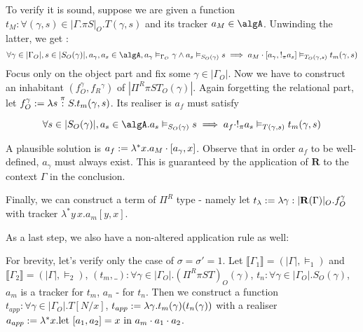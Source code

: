 \documentclass[12pt,a4paper]{article}
\renewcommand{\O}{_{O}}\alwaysmath{O}
\newcommand{\R}{\ensuremath{_{R}}}
\begin{document}
To verify it is sound, suppose we are given a function $t_M : \forall (\gamma , s) \in |\Gamma. \pi S|\O. T(\gamma, s)$ and its tracker $a_M \in \algA$. Unwinding the latter, we get :
$$\forall \gamma \in |\Gamma\O|, s \in |S\O(\gamma)|, a_\gamma, a_s \in \algA, a_\gamma \vDash_{\Gamma\O} \gamma \land a_s \vDash_{S\O(\gamma)} s \implies a_M \cdot [a_\gamma, !_\pi a_s] \vDash_{T\O(\gamma, s)} t_m(\gamma, s)$$
Focus only on the object part and fix some $\gamma \in |\Gamma\O|$. Now we have to construct an inhabitant $(f\O^\gamma, f\R^\gamma) $ of $|\Pi^R \pi S T\O(\gamma)|$. Again forgetting the relational part, let $f\O^\gamma \define \lambda s \overset{\pi}{:} S. t_m(\gamma, s)$. Its realiser is $a_f$ must satisfy

$$ \forall s \in |S\O(\gamma)|, a_s \in \algA . a_s \vDash_{S\O(\gamma)} s \implies a_f \cdot !_\pi a_s \vDash_{T(\gamma, s)} t_m(\gamma, s) $$

A plausible solution is $a_f := \lambda^* x. a_M \cdot [a_\gamma, x]$. Observe that in order $a_f$ to be well-defined, $a_\gamma$ must always exist. This is guaranteed by the application of $\mathbf{R}$ to the context $\Gamma$ in the conclusion. 

Finally, we can construct  a term of $\Pi^R$ type - namely let $t_\lambda \define \lambda \gamma : |\mathbf{R}(\Gamma)|\O. f\O^\gamma$ with tracker $\lambda^*y\, x.a_m[y, x]$.

As a last step, we also have a non-altered application rule as well:
\begin{center}
  \centering
\end{center}
For brevity, let's verify only the case of $\sigma = \sigma' = 1$. Let $\llbracket \Gamma_1 \rrbracket = (|\Gamma|, \vDash_1)$ and $\llbracket \Gamma_2 \rrbracket = (|\Gamma|, \vDash_2)$, 
$(t_m, \_) : \forall \gamma \in |\Gamma\O|. (\Pi^R\pi S T)\O(\gamma)$, $t_n : \forall \gamma \in |\Gamma\O|. S\O(\gamma)$, $a_m$ is a tracker for $t_m$, $a_n$ - for $t_n$. Then we construct a function $t_{app} : \forall \gamma \in |\Gamma\O|.T[N/x]$, $t_{app} := \lambda \gamma. t_m(\gamma)(t_n(\gamma))$ with a realiser $a_{app} := \lambda^* x. \text{let } [a_1, a_2] = x \text{ in } a_m \cdot a_1 \cdot a_2$.
\end{document}
